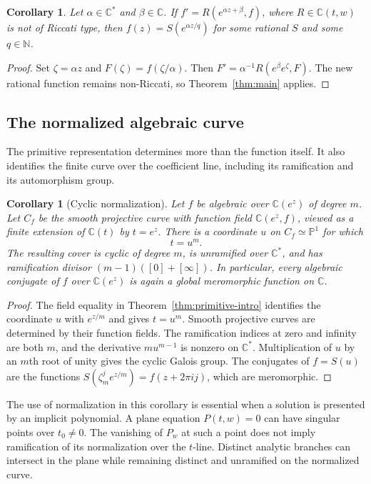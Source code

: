 \documentclass[11pt,reqno]{amsart}
\numberwithin{equation}{section}
\newtheorem{corollary}[theorem]{Corollary}
\theoremstyle{definition}
\theoremstyle{remark}
\newcommand{\C}{\mathbb C}
\newcommand{\N}{\mathbb N}
\newcommand{\PP}{\mathbb P}
\begin{document}
\begin{corollary}
\label{cor:rescaled}
Let $\alpha\in\C^*$ and $\beta\in\C$. If
$f'=R(e^{\alpha z+\beta},f)$, where $R\in\C(t,w)$ is not of
Riccati type, then $f(z)=S(e^{\alpha z/q})$ for some rational $S$
and some $q\in\N$.
\end{corollary}

\begin{proof}
Set $\zeta=\alpha z$ and $F(\zeta)=f(\zeta/\alpha)$.
Then $F'=\alpha^{-1}R(e^\beta e^\zeta,F)$. The new rational
function remains non-Riccati, so Theorem~\ref{thm:main} applies.
\end{proof}

\subsection{The normalized algebraic curve}

The primitive representation determines more than the function itself.
It also identifies the finite curve over the coefficient line, including
its ramification and its automorphism group.

\begin{corollary}[Cyclic normalization]
\label{cor:cyclic-normalization}
Let $f$ be algebraic over $\C(e^z)$ of degree $m$. Let $C_f$ be
the smooth projective curve with function field $\C(e^z,f)$,
viewed as a finite extension of $\C(t)$ by $t=e^z$. There is a
coordinate $u$ on $C_f\simeq\PP^1$ for which
\[
 t=u^m.
\]
The resulting cover is cyclic of degree $m$, is unramified over
$\C^*$, and has ramification divisor
$(m-1)([0]+[\infty])$. In particular, every algebraic conjugate of
$f$ over $\C(e^z)$ is again a global meromorphic function on $\C$.
\end{corollary}

\begin{proof}
The field equality in Theorem~\ref{thm:primitive-intro} identifies
the coordinate $u$ with $e^{z/m}$ and gives $t=u^m$. Smooth
projective curves are determined by their function fields. The
ramification indices at zero and infinity are both $m$, and the
derivative $m u^{m-1}$ is nonzero on $\C^*$. Multiplication of $u$
by an $m$th root of unity gives the cyclic Galois group. The
conjugates of $f=S(u)$ are the functions
$S(\zeta_m^j e^{z/m})=f(z+2\pi i j)$, which are meromorphic.
\end{proof}

The use of normalization in this corollary is essential when a
solution is presented by an implicit polynomial. A plane equation
$P(t,w)=0$ can have singular points over $t_0\ne0$. The vanishing
of $P_w$ at such a point does not imply ramification of its
normalization over the $t$-line. Distinct analytic branches can
intersect in the plane while remaining distinct and unramified on
the normalized curve.
\end{document}
